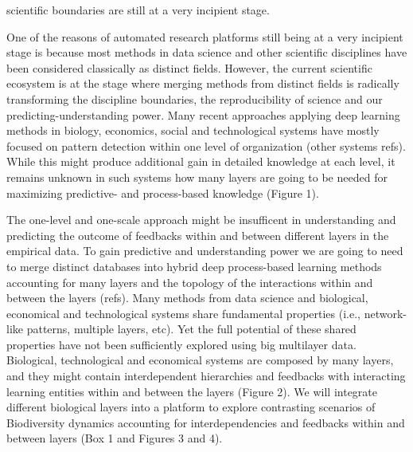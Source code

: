 \documentclass[authoryear,1p,12pt]{elsarticle}
\begin{document}
scientific boundaries
are still at a very incipient stage.

One of the reasons of automated research platforms still being at a
very incipient stage is because most methods in data science and other
scientific disciplines have been considered classically as distinct
fields. However, the current scientific ecosystem is at the stage
where merging methods from distinct fields is radically transforming
the discipline boundaries, the reproducibility of science and our
predicting-understanding power\citep{Reichsteietal2019}. Many recent
approaches applying deep learning methods in biology, economics,
social and technological systems have mostly focused on pattern
detection within one level of organization \citep{Sheehan&Song:2016}
(other systems refs). While this might produce additional gain in
detailed knowledge at each level, it remains unknown in such systems
how many layers are going to be needed for maximizing predictive- and
process-based knowledge (Figure 1).

The one-level and one-scale approach might be insufficent in
understanding and predicting the outcome of feedbacks within and
between different layers in the empirical data. To gain predictive and
understanding power we are going to need to merge distinct databases
into hybrid deep process-based learning methods accounting for many
layers and the topology of the interactions within and between the
layers\citep{Melianetal:2018} (refs). Many methods from data science
and biological, economical and technological systems share fundamental
properties (i.e., network-like patterns, multiple layers, etc). Yet
the full potential of these shared properties have not been
sufficiently explored using big multilayer data. Biological,
technological and economical systems are composed by many layers, and
they might contain interdependent hierarchies and feedbacks with
interacting learning entities within and between the layers (Figure
2). We will integrate different biological layers into a platform to
explore contrasting scenarios of Biodiversity dynamics accounting for
interdependencies and feedbacks within and between layers (Box 1 and
Figures 3 and 4).
\end{document}
